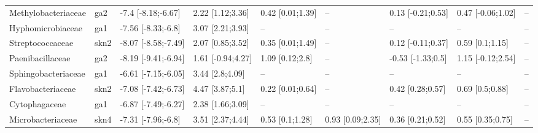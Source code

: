 \begin{table}
{\begin{tabular}[t]{lllllllll}
\hspace{1em}Methylobacteriaceae & ga2 & -7.4 [-8.18;-6.67] & 2.22 [1.12;3.36] & 0.42 [0.01;1.39] & -- & 0.13 [-0.21;0.53] & 0.47 [-0.06;1.02] & --\\
\hspace{1em}Hyphomicrobiaceae & ga1 & -7.56 [-8.33;-6.8] & 3.07 [2.21;3.93] & -- & -- & -- & -- & --\\
\hspace{1em}Streptococcaceae & skn2 & -8.07 [-8.58;-7.49] & 2.07 [0.85;3.52] & 0.35 [0.01;1.49] & -- & 0.12 [-0.11;0.37] & 0.59 [0.1;1.15] & --\\
\hspace{1em}Paenibacillaceae & ga2 & -8.19 [-9.41;-6.94] & 1.61 [-0.94;4.27] & 1.09 [0.12;2.8] & -- & -0.53 [-1.33;0.5] & 1.15 [-0.12;2.54] & --\\
\hspace{1em}Sphingobacteriaceae & ga1 & -6.61 [-7.15;-6.05] & 3.44 [2.8;4.09] & -- & -- & -- & -- & --\\
\hspace{1em}Flavobacteriaceae & skn2 & -7.08 [-7.42;-6.73] & 4.47 [3.87;5.1] & 0.22 [0.01;0.64] & -- & 0.42 [0.28;0.57] & 0.69 [0.5;0.88] & --\\
\hspace{1em}Cytophagaceae & ga1 & -6.87 [-7.49;-6.27] & 2.38 [1.66;3.09] & -- & -- & -- & -- & --\\
\hspace{1em}Microbacteriaceae & skn4 & -7.31 [-7.96;-6.8] & 3.51 [2.37;4.44] & 0.53 [0.1;1.28] & 0.93 [0.09;2.35] & 0.36 [0.21;0.52] & 0.55 [0.35;0.75] & --\\
\bottomrule
\end{tabular}}
\end{table}